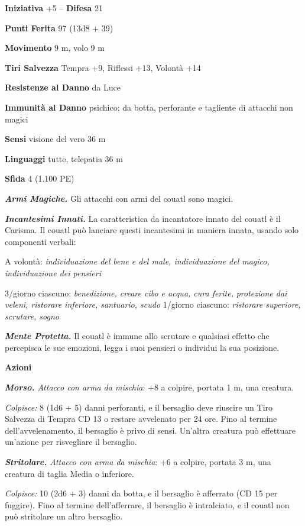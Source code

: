 \begin{multicols}{2}
\textbf{Iniziativa} +5 -- \textbf{Difesa} 21

\textbf{Punti Ferita} 97 (13d8 + 39)

\textbf{Movimento} 9 m, volo 9 m

\textbf{Tiri Salvezza} Tempra +9, Riflessi +13, Volontà +14

\textbf{Resistenze al Danno} da Luce

\textbf{Immunità al Danno} psichico; da botta, perforante e tagliente di attacchi non magici

\textbf{Sensi} visione del vero 36 m

\textbf{Linguaggi} tutte, telepatia 36 m 

\textbf{Sfida} 4 (1.100 PE)

\emph{\textbf{Armi Magiche.}} Gli attacchi con armi del couatl sono magici.

\emph{\textbf{Incantesimi Innati.}} La caratteristica da incantatore innato del couatl è il Carisma. Il couatl può lanciare questi incantesimi in maniera innata, usando solo componenti verbali:

A volontà: \emph{individuazione del bene e del male, individuazione del magico, individuazione dei pensieri}

3/giorno ciascuno: \emph{benedizione, creare cibo e acqua, cura ferite,} \emph{protezione dai veleni, ristorare inferiore, santuario, scudo} 1/giorno ciascuno: \emph{ristorare superiore, scrutare, sogno}

\emph{\textbf{Mente Protetta.}} Il couatl è immune allo scrutare e qualsiasi effetto che percepisca le sue emozioni, legga i suoi pensieri o individui la sua posizione.

\textbf{Azioni}

\emph{\textbf{Morso.} Attacco con arma da mischia}: +8 a colpire, portata 1 m, una creatura.

\emph{Colpisce:} 8 (1d6 + 5) danni perforanti, e il bersaglio deve riuscire un Tiro Salvezza di Tempra CD 13 o restare avvelenato per 24 ore. Fino al termine dell'avvelenamento, il bersaglio è privo di sensi. Un'altra creatura può effettuare un'azione per risvegliare il bersaglio.

\emph{\textbf{Stritolare.} Attacco con arma da mischia}: +6 a colpire, portata 3 m, una creatura di taglia Media o inferiore.

\emph{Colpisce:} 10 (2d6 + 3) danni da botta, e il bersaglio è afferrato (CD 15 per fuggire). Fino al termine dell'afferrare, il bersaglio è intralciato, e il couatl non può stritolare un altro bersaglio.


\end{multicols}
